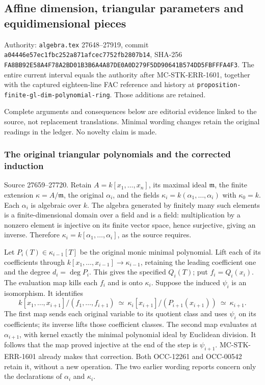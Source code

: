 \subsection{Affine dimension, triangular parameters and equidimensional pieces}\label{algebra-proof-025-affine-dimension-triangular-parameters-and-equidimensional-pieces}

Authority: \texttt{algebra.tex} 27648--27919, commit \texttt{a04446e57ec1fbc252a871afcec7752fb2807b14}, SHA-256 \texttt{FA8BB92E58A4F78A2BD01B3B6A4A87DE0A0D279F5DD90641B574DD5FBFFFA4F3}. The entire current interval equals the authority after MC-STK-ERR-1601, together with the captured eighteen-line FAC reference and history at \texttt{proposition-finite-gl-dim-polynomial-ring}. Those additions are retained.

Complete arguments and consequences below are editorial evidence linked to the source, not replacement translations. Minimal wording changes retain the original readings in the ledger. No novelty claim is made.

\subsubsection{The original triangular polynomials and the corrected induction}\label{algebra-proof-025-the-original-triangular-polynomials-and-the-corrected-induction}

Source 27659--27720. Retain \(A=k[x_1,\ldots,x_n]\), its maximal ideal \(\mathfrak m\), the finite extension \(\kappa=A/\mathfrak m\), the original \(\alpha_i\), and the fields \(\kappa_i=k(\alpha_1,\ldots,\alpha_i)\) with \(\kappa_0=k\). Each \(\alpha_i\) is algebraic over \(k\). The algebra generated by finitely many such elements is a finite-dimensional domain over a field and is a field: multiplication by a nonzero element is injective on its finite vector space, hence surjective, giving an inverse. Therefore \(\kappa_i=k[\alpha_1,\ldots,\alpha_i]\), as the source requires.

Let \(P_i(T)\in\kappa_{i-1}[T]\) be the original monic minimal polynomial. Lift each of its coefficients through \(k[x_1,\ldots,x_{i-1}]\to\kappa_{i-1}\), retaining the leading coefficient one and the degree \(d_i=\deg P_i\). This gives the specified \(Q_i(T)\); put \(f_i=Q_i(x_i)\). The evaluation map kills each \(f_i\) and is onto \(\kappa_i\). Suppose the induced \(\psi_i\) is an isomorphism. It identifies \[
 k[x_1,\ldots,x_{i+1}]/(f_1,\ldots,f_{i+1})
 \ \simeq\ \kappa_i[x_{i+1}]/(P_{i+1}(x_{i+1}))
 \ \simeq\ \kappa_{i+1}.
\] The first map sends each original variable to its quotient class and uses \(\psi_i\) on its coefficients; its inverse lifts those coefficient classes. The second map evaluates at \(\alpha_{i+1}\), with kernel exactly the minimal polynomial ideal by Euclidean division. It follows that the map proved injective at the end of the step is \(\psi_{i+1}\). MC-STK-ERR-1601 already makes that correction. Both OCC-12261 and OCC-00542 retain it, without a new operation. The two earlier wording reports concern only the declarations of \(\alpha_i\) and \(\kappa_i\).

